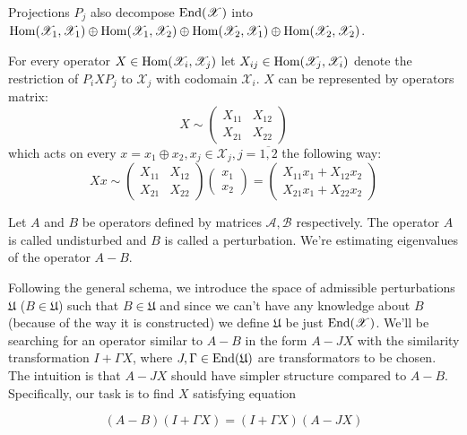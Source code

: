\documentclass{article}
\begin{document}
Projections \( P_j \) also decompose \( \mathrm{End}({\mathscr X}) \) into
\( \mathrm{Hom}({\mathscr X_1},{\mathscr X_1})
    \oplus \mathrm{Hom}({\mathscr X_1},{\mathscr X_2})
    \oplus \mathrm{Hom}({\mathscr X_2},{\mathscr X_1})
    \oplus \mathrm{Hom}({\mathscr X_2},{\mathscr X_2}) \).

For every operator \( X\in\mathrm{Hom}({\mathscr X_i},{\mathscr X_j}) \)
let \( X_{ij} \in \mathrm{Hom}({\mathscr X_j},{\mathscr X_i}) \)
denote the restriction of \( P_i X P_j \) to \( \mathscr X_j \) with codomain \( \mathscr X_i \).
\( X \) can be represented by operators matrix:
\[X \sim \begin{pmatrix}
    X_{11} & X_{12} \\
    X_{21} & X_{22}
\end{pmatrix}\]
which acts on every \( x = x_1 \oplus x_2, x_j\in\mathscr X_j,j=\overline{1,2} \) the following way:
\[
X x \sim
\begin{pmatrix}
    X_{11} & X_{12} \\
    X_{21} & X_{22}
\end{pmatrix}
\begin{pmatrix} x_1 \\ x_2 \end{pmatrix}
= \begin{pmatrix}
    X_{11} x_1 + X_{12} x_2 \\
    X_{21} x_1 + X_{22} x_2
\end{pmatrix}
\]


Let \( A \) and \( B \) be operators defined by matrices \( \mathcal A, \mathcal B \) respectively.
The operator \( A \) is called undisturbed and \( B \) is called a perturbation.
We're estimating eigenvalues of the operator \( A - B \).

Following the general schema, we introduce
the space of admissible perturbations \( \mathfrak U \) (\( B\in\mathfrak U \))
such that \( B \in \mathfrak U \)
and since we can't have any knowledge about \( B \) (because of the way it is constructed)
we define \( \mathfrak U \) be just \( \mathrm{End}({\mathscr X}) \).
We'll be searching for an operator similar to \( A - B \)
in the form \( A - JX \) with the similarity transformation \( I + \Gamma X \),
where \( J, \Gamma \in \mathrm{End}({\mathfrak U}) \) are transformators to be chosen.
The intuition is that \( A - JX \) should have simpler structure compared to \( A-B \).
Specifically, our task is to find \( X \) satisfying equation

\begin{equation}\label{eq:simopmain}
    (A - B)(I + \Gamma X) = (I + \Gamma X)(A - JX)
\end{equation}
\end{document}
